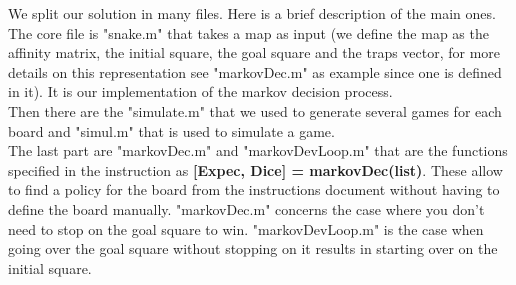 \documentclass{eplDoc}
\begin{document}
We split our solution in many files. Here is a brief description of the main ones. \\ 
The core file is "snake.m" that takes a map as input (we define the map as the affinity matrix, the initial square, the goal square and the traps vector, for more details on this representation see "markovDec.m" as example since one is defined in it). It is our implementation of the markov decision process.  \\ 
Then there are the "simulate.m" that we used to generate several games for each board and "simul.m" that is used to simulate a game. \\ 
The last part are "markovDec.m" and "markovDevLoop.m" that are the functions specified in the instruction as \textbf{[Expec, Dice] = markovDec(list)}. These allow to find a policy for the board from the instructions document without having to define the board manually. "markovDec.m" concerns the case where you don't need to stop on the goal square to win. "markovDevLoop.m" is the case when going over the goal square without stopping on it results in starting over on the initial square. 
\end{document}
